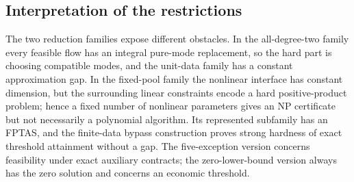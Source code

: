 \subsection{Interpretation of the restrictions}\label{s3:scope}

The two reduction families expose different obstacles. In the
all-degree-two family every feasible flow has an integral pure-mode
replacement, so the hard part is choosing compatible modes, and the
unit-data family has a constant approximation gap. In the fixed-pool
family the nonlinear interface has constant dimension, but the
surrounding linear constraints encode a hard positive-product problem;
hence a fixed number of nonlinear parameters gives an NP certificate but
not necessarily a polynomial algorithm. Its represented subfamily has an
FPTAS, and the finite-data bypass construction proves strong hardness of
exact threshold attainment without a gap. The five-exception version
concerns feasibility under exact auxiliary contracts; the
zero-lower-bound version always has the zero solution and concerns an
economic threshold.
